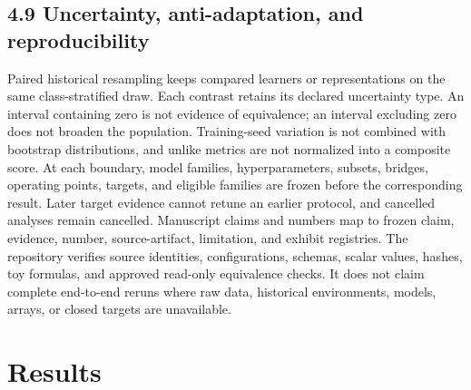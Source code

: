 \documentclass[preprint,12pt]{elsarticle}
\begin{document}
\subsection{4.9 Uncertainty, anti-adaptation, and reproducibility}
Paired historical resampling keeps compared learners or representations on the same class-stratified draw. Each contrast retains its declared uncertainty type. An interval containing zero is not evidence of equivalence; an interval excluding zero does not broaden the population. Training-seed variation is not combined with bootstrap distributions, and unlike metrics are not normalized into a composite score.
At each boundary, model families, hyperparameters, subsets, bridges, operating points, targets, and eligible families are frozen before the corresponding result. Later target evidence cannot retune an earlier protocol, and cancelled analyses remain cancelled. Manuscript claims and numbers map to frozen claim, evidence, number, source-artifact, limitation, and exhibit registries. The repository verifies source identities, configurations, schemas, scalar values, hashes, toy formulas, and approved read-only equivalence checks. It does not claim complete end-to-end reruns where raw data, historical environments, models, arrays, or closed targets are unavailable.

\section{Results}
\end{document}
